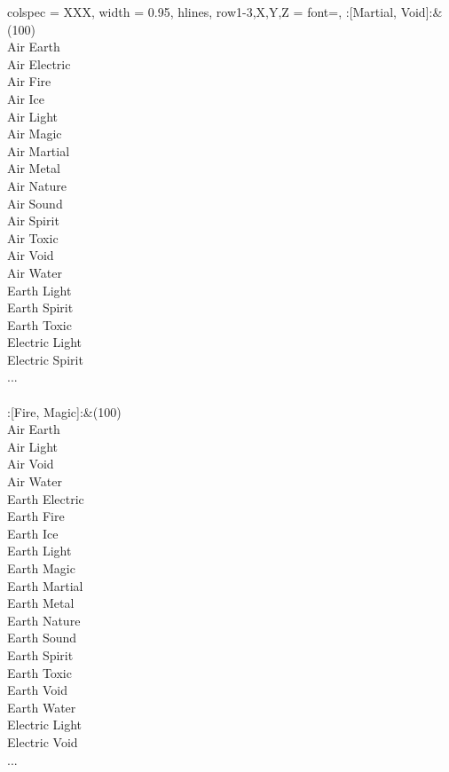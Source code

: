 \begin{longtblr}[
	caption = {2v2 Defending Weak},
	label = {2v2-Defending-Weak},
]{
	colspec = {XXX}, width = 0.95\linewidth,
	hlines,
	row{1-3,X,Y,Z} = {font=\bfseries},
}
	:[Martial, Void]:&{(100)\\
	Air Earth \\
	Air Electric \\
	Air Fire \\
	Air Ice \\
	Air Light \\
	Air Magic \\
	Air Martial \\
	Air Metal \\
	Air Nature \\
	Air Sound \\
	Air Spirit \\
	Air Toxic \\
	Air Void \\
	Air Water \\
	Earth Light \\
	Earth Spirit \\
	Earth Toxic \\
	Electric Light \\
	Electric Spirit \\
	...\\
	}\\

	:[Fire, Magic]:&{(100)\\
	Air Earth \\
	Air Light \\
	Air Void \\
	Air Water \\
	Earth Electric \\
	Earth Fire \\
	Earth Ice \\
	Earth Light \\
	Earth Magic \\
	Earth Martial \\
	Earth Metal \\
	Earth Nature \\
	Earth Sound \\
	Earth Spirit \\
	Earth Toxic \\
	Earth Void \\
	Earth Water \\
	Electric Light \\
	Electric Void \\
	...\\
	}\\


\end{longtblr}
